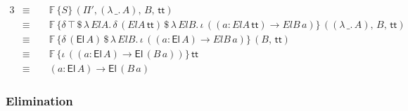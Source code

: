 \documentclass[acmsmall,screen,review]{acmart}
\newcommand{\msf}[1]{{\mathsf{#1}}}
\newcommand{\mbb}[1]{\mathbb{#1}}
\newcommand{\El}{\msf{El}}
\newcommand{\ttt}{\msf{tt}}
\newcommand{\F}{\mbb{F}}
\begin{document}
\begin{example}
\begin{itemize}
\begin{alignat*}{3}
    & \equiv\,\, &&\F\,\{S\}\,(\Pi',(\lambda\,\_.\,A),\,B,\,\ttt)\\
    & \equiv\,\, &&\F\,\{\delta\,\top\,\$\,\lambda\,{ElA}.\, \delta\,({ElA}\,\ttt)\,\$\,\lambda\,{ElB}.\,\iota\, ((a : {ElA}\,\ttt) \to {ElB}\,a)\}\,((\lambda\,\_.\,A),\,B,\,\ttt)\\
    & \equiv\,\, &&\F\,\{\delta\,(\El\,A)\,\$\,\lambda\,{ElB}.\,\iota\, ((a : \El\,A) \to {ElB}\,a)\}\,(B,\,\ttt)\\
    & \equiv\,\, &&\F\,\{\iota\,((a : \El\,A) \to \El\,(B\,a))\}\,\ttt\\
    & \equiv\,\, && (a : \El\,A) \to \El\,(B\,a)
  \end{alignat*}
\end{itemize}
\end{example}

\subsubsection{Elimination}\label{sec:ir-elimination}
\end{document}
